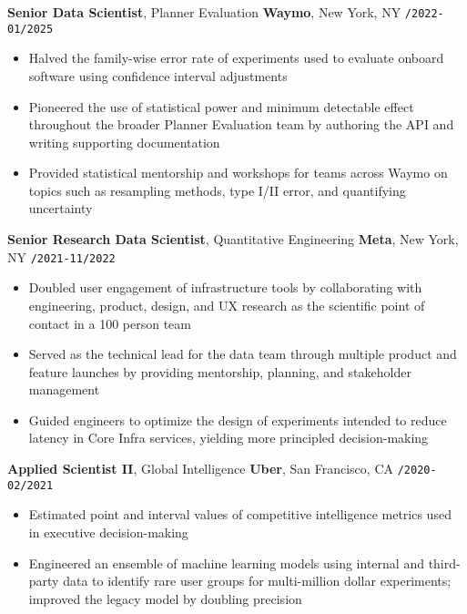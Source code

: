 \documentclass[10pt,english]{article}
\newcommand{\blockbreak} {
  \vspace{3mm}
}
\begin{document}
\blockbreak

\textbf{Senior Data Scientist}, Planner Evaluation \hfill \textbf{Waymo}, New York, NY \texttt{/2022-01/2025}
\begin{itemize}
  \item Halved the family-wise error rate of experiments used to evaluate onboard software using confidence interval adjustments
  \item Pioneered the use of statistical power and minimum detectable effect throughout the broader Planner Evaluation team by authoring the API and writing supporting documentation
  \item Provided statistical mentorship and workshops for teams across Waymo on topics such as resampling methods, type I/II error, and quantifying uncertainty
\end{itemize}

\blockbreak

\textbf{Senior Research Data Scientist}, Quantitative Engineering \hfill \textbf{Meta}, New York, NY \texttt{/2021-11/2022}
\begin{itemize}
  \item Doubled user engagement of infrastructure tools by collaborating with engineering, product, design, and UX research as the scientific point of contact in a 100 person team
  \item Served as the technical lead for the data team through multiple product and feature launches by providing mentorship, planning, and stakeholder management
  \item Guided engineers to optimize the design of experiments intended to reduce latency in Core Infra services, yielding more principled decision-making
\end{itemize}

\blockbreak

\textbf{Applied Scientist II}, Global Intelligence \hfill \textbf{Uber}, San Francisco, CA \texttt{/2020-02/2021}
\begin{itemize}
  \item Estimated point and interval values of competitive intelligence metrics used in executive decision-making
  \item Engineered an ensemble of machine learning models using internal and third-party data to identify rare user groups for multi-million dollar experiments; improved the legacy model by doubling precision
\end{itemize}
\end{document}
